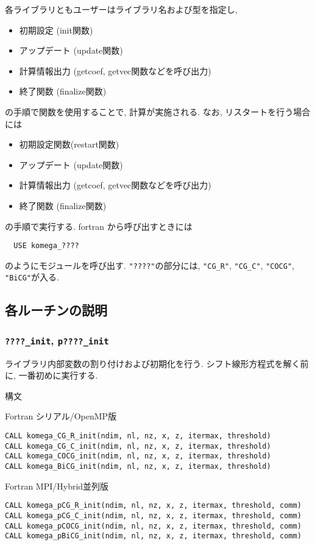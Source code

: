 \documentclass[12pt,titlepage]{jarticle}
\begin{document}
各ライブラリともユーザーはライブラリ名および型を指定し, 
\begin{itemize}
\item 初期設定 (init関数)
\item アップデート (update関数)
\item 計算情報出力 (getcoef, getvec関数などを呼び出力)
\item 終了関数 (finalize関数)
\end{itemize}
の手順で関数を使用することで, 計算が実施される. 
なお, リスタートを行う場合には
\begin{itemize}
\item 初期設定関数(restart関数)
\item アップデート (update関数)
\item 計算情報出力 (getcoef, getvec関数などを呼び出力)
\item 終了関数 (finalize関数)
\end{itemize}
の手順で実行する.
fortran から呼び出すときには
\begin{verbatim}
  USE komega_????
\end{verbatim}
のようにモジュールを呼び出す. \verb|"????"|の部分には,
\verb|"CG_R"|, \verb|"CG_C"|, \verb|"COCG"|, \verb|"BiCG"|が入る.

\subsection{各ルーチンの説明}

\subsubsection{\texttt{????\_init}, \texttt{p????\_init}}

ライブラリ内部変数の割り付けおよび初期化を行う.
シフト線形方程式を解く前に, 一番初めに実行する.

\noindent 構文

\noindent Fortran シリアル/OpenMP版
\begin{verbatim}
CALL komega_CG_R_init(ndim, nl, nz, x, z, itermax, threshold)
CALL komega_CG_C_init(ndim, nl, nz, x, z, itermax, threshold)
CALL komega_COCG_init(ndim, nl, nz, x, z, itermax, threshold)
CALL komega_BiCG_init(ndim, nl, nz, x, z, itermax, threshold)
\end{verbatim}

\noindent Fortran MPI/Hybrid並列版
\begin{verbatim}
CALL komega_pCG_R_init(ndim, nl, nz, x, z, itermax, threshold, comm)
CALL komega_pCG_C_init(ndim, nl, nz, x, z, itermax, threshold, comm)
CALL komega_pCOCG_init(ndim, nl, nz, x, z, itermax, threshold, comm)
CALL komega_pBiCG_init(ndim, nl, nz, x, z, itermax, threshold, comm)
\end{verbatim}
\end{document}
